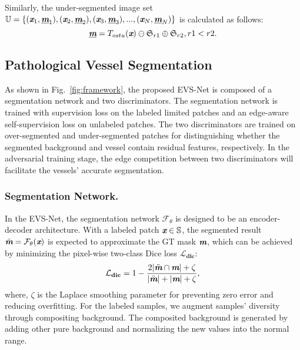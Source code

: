 \documentclass[letterpaper]{article} %
\begin{document}
Similarly, the under-segmented image set $\mathbb{U}=\{(\textbf{\em x}_1,\underline{\textbf{\em m}}_1), (\textbf{\em x}_2,\underline{\textbf{\em m}}_2),(\textbf{\em x}_3,\underline{\textbf{\em m}}_3), ..., (\textbf{\em x}_N,\underline{\textbf{\em m}}_N)\}$ is calculated as follows:
\begin{equation}\label{eq2}
\underline{\textbf{\em m}}=T_{ostu}(\textbf{\em x})\ominus \mathfrak{S}_{r1} \oplus \mathfrak{S}_{r2}, r1<r2.
\end{equation}



\subsection{Pathological Vessel Segmentation}
As shown in Fig.~\ref{fig:framework}, the proposed EVS-Net is composed of a segmentation network and two discriminators.
The segmentation network is trained with supervision loss on the labeled limited patches
and an edge-aware self-supervision loss on unlabeled patches.
The two discriminators are trained on over-segmented and under-segmented patches for distinguishing whether the segmented background and vessel contain residual features, respectively.
In the adversarial training stage, the edge competition between two discriminators will facilitate the vessels' accurate segmentation.


\subsubsection{Segmentation Network.}
In the EVS-Net, the segmentation network $\mathcal{F}_{\theta}$ is designed to be an encoder-decoder architecture. With a labeled patch $\textbf{\em x}\in \mathbb{S}$, the segmented result $\ddot{\textbf{\em m}}=\mathcal{F}_{\theta}(\textbf{\em x})$ is expected to approximate the GT mask $\textbf{\em m}$, which can be achieved by minimizing the pixel-wise two-class Dice loss $\mathbf{\mathcal{L}_{dic}}$:
\begin{equation}\label{eq1}
\mathbf{\mathcal{L}_{dic}}=1-\frac{2|\ddot{\textbf{\em m}} \cap \textbf{\em m}|+\zeta}{|\ddot{\textbf{\em m}}|+|\textbf{\em m}|+\zeta},
\end{equation}
where, $\zeta$ is the Laplace smoothing parameter for preventing zero error and reducing overfitting.
For the labeled samples, we augment samples' diversity through compositing background.
The composited background is generated by adding other pure background and normalizing the new values into the normal range.
\end{document}
